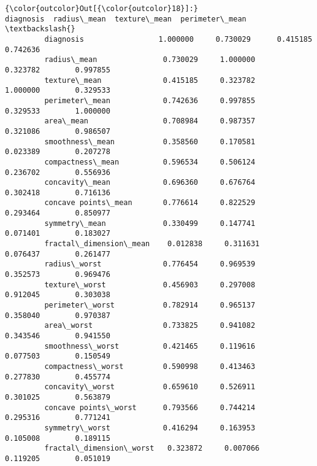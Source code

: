 \documentclass[11pt]{article}
\begin{document}
\begin{Verbatim}[commandchars=\\\{\}]
{\color{outcolor}Out[{\color{outcolor}18}]:}                          diagnosis  radius\_mean  texture\_mean  perimeter\_mean  \textbackslash{}
         diagnosis                 1.000000     0.730029      0.415185        0.742636   
         radius\_mean               0.730029     1.000000      0.323782        0.997855   
         texture\_mean              0.415185     0.323782      1.000000        0.329533   
         perimeter\_mean            0.742636     0.997855      0.329533        1.000000   
         area\_mean                 0.708984     0.987357      0.321086        0.986507   
         smoothness\_mean           0.358560     0.170581      0.023389        0.207278   
         compactness\_mean          0.596534     0.506124      0.236702        0.556936   
         concavity\_mean            0.696360     0.676764      0.302418        0.716136   
         concave points\_mean       0.776614     0.822529      0.293464        0.850977   
         symmetry\_mean             0.330499     0.147741      0.071401        0.183027   
         fractal\_dimension\_mean    0.012838     0.311631      0.076437        0.261477   
         radius\_worst              0.776454     0.969539      0.352573        0.969476   
         texture\_worst             0.456903     0.297008      0.912045        0.303038   
         perimeter\_worst           0.782914     0.965137      0.358040        0.970387   
         area\_worst                0.733825     0.941082      0.343546        0.941550   
         smoothness\_worst          0.421465     0.119616      0.077503        0.150549   
         compactness\_worst         0.590998     0.413463      0.277830        0.455774   
         concavity\_worst           0.659610     0.526911      0.301025        0.563879   
         concave points\_worst      0.793566     0.744214      0.295316        0.771241   
         symmetry\_worst            0.416294     0.163953      0.105008        0.189115   
         fractal\_dimension\_worst   0.323872     0.007066      0.119205        0.051019   
         

\end{Verbatim}
\end{document}
